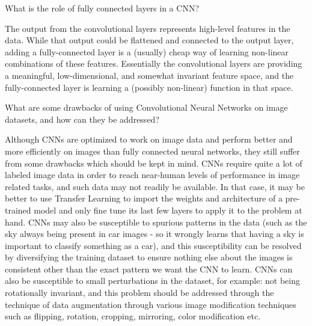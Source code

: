 	\begin{qanda}
		\begin{question}
What is the role of fully connected layers in a CNN?
		\end{question}
		\begin{answer}
The output from the convolutional layers represents high-level features in the data. While that output could be flattened and connected to the output layer, adding a fully-connected layer is a (usually) cheap way of learning non-linear combinations of these features. Essentially the convolutional layers are providing a meaningful, low-dimensional, and somewhat invariant feature space, and the fully-connected layer is learning a (possibly non-linear) function in that space.
		\end{answer}
	\end{qanda}

	\begin{qanda}
		\begin{question}
What are some drawbacks of using Convolutional Neural Networks on image datasets, and how can they be addressed?
		\end{question}
		\begin{answer}
Although CNNs are optimized to work on image data and perform better and more efficiently on images than fully connected neural networks, they still suffer from some drawbacks which should be kept in mind. CNNs require quite a lot of labeled image data in order to reach near-human levels of performance in image related tasks, and such data may not readily be available. In that case, it may be better to use Transfer Learning to import the weights and architecture of a pre-trained model and only fine tune its last few layers to apply it to the problem at hand. CNNs may also be susceptible to spurious patterns in the data (such as the sky always being present in car images - so it wrongly learns that having a sky is important to classify something as a car), and this susceptibility can be resolved by diversifying the training dataset to ensure nothing else about the images is consistent other than the exact pattern we want the CNN to learn. CNNs can also be susceptible to small perturbations in the dataset, for example: not being rotationally invariant, and this problem should be addressed through the technique of data augmentation through various image modification techniques such as flipping, rotation, cropping, mirroring, color modification etc.
		\end{answer}
	\end{qanda}

